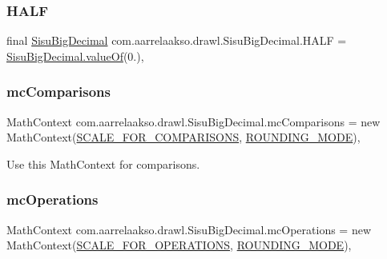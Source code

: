 \subsubsection{\texorpdfstring{H\+A\+LF}{HALF}}
{\footnotesize\ttfamily final \hyperlink{classcom_1_1aarrelaakso_1_1drawl_1_1_sisu_big_decimal}{Sisu\+Big\+Decimal} com.\+aarrelaakso.\+drawl.\+Sisu\+Big\+Decimal.\+H\+A\+LF = \hyperlink{classcom_1_1aarrelaakso_1_1drawl_1_1_sisu_big_decimal_a076ac8cd04ac04e39f7f3fcc7ce9a4a1}{Sisu\+Big\+Decimal.\+value\+Of}(0.)\hspace{0.3cm}{\ttfamily [static]}, {\ttfamily [protected]}}

\mbox{\label{classcom_1_1aarrelaakso_1_1drawl_1_1_sisu_big_decimal_a9fa3952ce422ce15868eb125788d9054}} 
\subsubsection{\texorpdfstring{mc\+Comparisons}{mcComparisons}}
{\footnotesize\ttfamily Math\+Context com.\+aarrelaakso.\+drawl.\+Sisu\+Big\+Decimal.\+mc\+Comparisons = new Math\+Context(\hyperlink{classcom_1_1aarrelaakso_1_1drawl_1_1_sisu_big_decimal_a5d8592149ed329cfd2f80ec81e790a9e}{S\+C\+A\+L\+E\+\_\+\+F\+O\+R\+\_\+\+C\+O\+M\+P\+A\+R\+I\+S\+O\+NS}, \hyperlink{classcom_1_1aarrelaakso_1_1drawl_1_1_sisu_big_decimal_afcdca984f764db570786fff2442142cb}{R\+O\+U\+N\+D\+I\+N\+G\+\_\+\+M\+O\+DE})\hspace{0.3cm}{\ttfamily [static]}, {\ttfamily [protected]}}

Use this Math\+Context for comparisons. \mbox{\label{classcom_1_1aarrelaakso_1_1drawl_1_1_sisu_big_decimal_a7986e3e83f8b0c7b5a3784757ffc5d1d}} 
\subsubsection{\texorpdfstring{mc\+Operations}{mcOperations}}
{\footnotesize\ttfamily Math\+Context com.\+aarrelaakso.\+drawl.\+Sisu\+Big\+Decimal.\+mc\+Operations = new Math\+Context(\hyperlink{classcom_1_1aarrelaakso_1_1drawl_1_1_sisu_big_decimal_a5dfdeb68abdc4865a00b27136c6e8c54}{S\+C\+A\+L\+E\+\_\+\+F\+O\+R\+\_\+\+O\+P\+E\+R\+A\+T\+I\+O\+NS}, \hyperlink{classcom_1_1aarrelaakso_1_1drawl_1_1_sisu_big_decimal_afcdca984f764db570786fff2442142cb}{R\+O\+U\+N\+D\+I\+N\+G\+\_\+\+M\+O\+DE})\hspace{0.3cm}{\ttfamily [static]}, {\ttfamily [protected]}}

